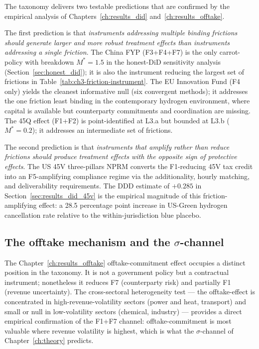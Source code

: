 The taxonomy delivers two testable predictions that are confirmed by the empirical analysis of Chapters~\ref{ch:results_did} and~\ref{ch:results_offtake}.

The first prediction is that \emph{instruments addressing multiple binding frictions should generate larger and more robust treatment effects than instruments addressing a single friction}. The China FYP (F3+F4+F7) is the only carrot-policy with breakdown $M^* = 1.5$ in the honest-DiD sensitivity analysis (Section~\ref{sec:honest_did}); it is also the instrument reducing the largest set of frictions in Table~\ref{tab:ch3-friction-instrument}. The EU Innovation Fund (F4 only) yields the cleanest informative null (six convergent methods); it addresses the one friction least binding in the contemporary hydrogen environment, where capital is available but counterparty commitments and coordination are missing. The 45Q effect (F1+F2) is point-identified at L3.a but bounded at L3.b ($M^* = 0.2$); it addresses an intermediate set of frictions.

The second prediction is that \emph{instruments that amplify rather than reduce frictions should produce treatment effects with the opposite sign of protective effects}. The US 45V three-pillars NPRM converts the F1-reducing 45V tax credit into an F5-amplifying compliance regime via the additionality, hourly matching, and deliverability requirements. The DDD estimate of $+0.285$ in Section~\ref{sec:results_did_45v} is the empirical magnitude of this friction-amplifying effect: a 28.5 percentage point increase in US-Green hydrogen cancellation rate relative to the within-jurisdiction blue placebo.

\subsection{The offtake mechanism and the $\sigma$-channel}
\label{sec:ch3-offtake-sigma}

The Chapter~\ref{ch:results_offtake} offtake-commitment effect occupies a distinct position in the taxonomy. It is not a government policy but a contractual instrument; nonetheless it reduces F7 (counterparty risk) and partially F1 (revenue uncertainty). The cross-sectoral heterogeneity test --- the offtake-effect is concentrated in high-revenue-volatility sectors (power and heat, transport) and small or null in low-volatility sectors (chemical, industry) --- provides a direct empirical confirmation of the F1+F7 channel: offtake-commitment is most valuable where revenue volatility is highest, which is what the $\sigma$-channel of Chapter~\ref{ch:theory} predicts.

